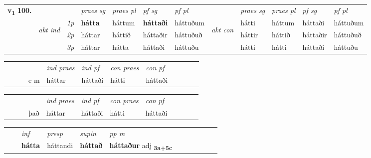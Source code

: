 \begin{tabular}{llllllllllll} \toprule
\multirow{4}{*}{{{\textbf{v{\textsubscript{1}}} \Large{\textbf{100.}}}}}  & &   &  \textit{praes sg}  & \textit{praes pl}  &\textit{ pf sg} & \textit{pf pl} &  &  \textit{praes sg}  & \textit{praes pl}  & \textit{pf sg} & \textit{pf pl } \\*
	\cmidrule{4-7} \cmidrule{9-12}
 & \multirow{3}{*}{\begin{turn}{90}\textit{akt ind}\end{turn}} & {\textit{1p}} & \textbf{hátta} & háttum    & \textbf{háttaði} & háttuðum & \multirow{3}{*}{\begin{turn}{90}\textit{akt con}\end{turn}} &hátti & háttum & háttaði & háttuðum\\*
& &  {\textit{2p}} &  háttar  & háttið   & háttaðir & háttuðuð & & háttir & háttið & háttaðir & háttuðuð \\*
& &  {\textit{3p}} & háttar & hátta   & háttaði & háttuðu & & hátti & hátti& háttaði & háttuðu  \\*
\cmidrule{4-7} \cmidrule{9-12}
\end{tabular}


\begin{tabular}{llllllllllll}
 & &  & &  \textit{ind praes} & \textit{ind pf} & \textit{con praes} & \textit{con pf} \\*
&  & & e-m & háttar & háttaði & hátti & háttaði \\*
\cmidrule{5-9}
\end{tabular}


\begin{tabular}{llllllllllll}
 & &  & &  \textit{ind praes} & \textit{ind pf} & \textit{con praes} & \textit{con pf} \\*
&  & & það & háttar & háttaði & hátti & háttaði \\*
\cmidrule{5-9}
\end{tabular}


\begin{tabular}{llllllllllll}
 & & \textit{inf}     & \textit{presp} & \textit{supin}  & \textit{pp m}     \\*
  & & \textbf{hátta}      & háttandi &  \textbf{háttað}  & \textbf{háttaður} adj \textbf{\textsubscript{3a+5c}} \\*
\cmidrule{1-12}
\end{tabular}



